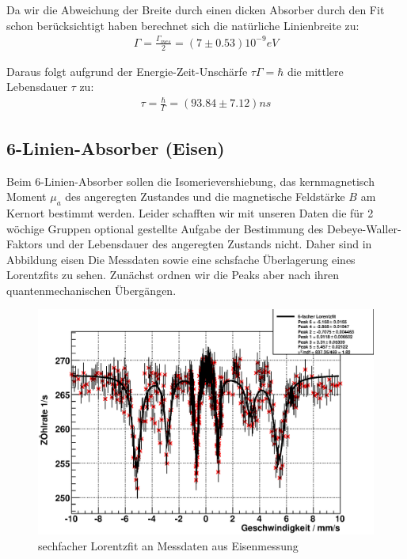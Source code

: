\documentclass[12pt]{article}
\begin{document}
Da wir die Abweichung der Breite durch einen dicken Absorber durch den Fit schon berücksichtigt haben berechnet sich die natürliche Linienbreite zu:
\begin{align*}
 \Gamma = \frac{\Gamma_{mes}}{2} = (7 \pm 0.53) 10^{-9}eV
\end{align*}

Daraus folgt aufgrund der Energie-Zeit-Unschärfe $\tau \Gamma = \hbar$ die mittlere Lebensdauer $\tau$ zu:
\begin{align*}
 \tau = \frac{\hbar}{\Gamma} = (93.84 \pm 7.12) ns
\end{align*}

\subsection{6-Linien-Absorber (Eisen)}

Beim 6-Linien-Absorber sollen die Isomerievershiebung, das kernmagnetisch Moment $\mu_a$ des angeregten Zustandes und die magnetische Feldstärke $B$
am Kernort bestimmt werden. Leider schafften wir mit unseren Daten die für 2 wöchige Gruppen optional gestellte Aufgabe der Bestimmung des
Debeye-Waller-Faktors und der Lebensdauer des angeregten Zustands nicht. Daher sind in Abbildung \refname{eisen} Die Messdaten sowie eine schsfache
Überlagerung eines Lorentzfits zu sehen. Zunächst ordnen wir die Peaks aber nach ihren quantenmechanischen Übergängen. 
\begin{figure}[H]
 \includegraphics[width=0.9\linewidth]{pictures/eisen.eps}
 \caption{sechfacher Lorentzfit an Messdaten aus Eisenmessung}
\end{figure}
\end{document}
